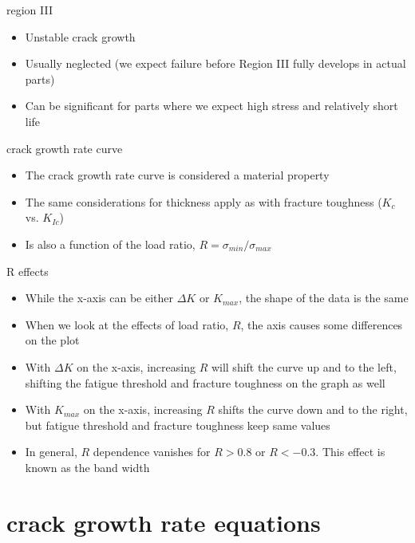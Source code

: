 \documentclass[10pt]{beamer}
\begin{document}
\begin{frame}{region III}
	\begin{itemize}[<+->]
		\item Unstable crack growth
		\item Usually neglected (we expect failure before Region III fully develops in actual parts)
		\item Can be significant for parts where we expect high stress and relatively short life
	\end{itemize}
\end{frame}

\begin{frame}{crack growth rate curve}
	\begin{itemize}[<+->]
		\item The crack growth rate curve is considered a material property
		\item The same considerations for thickness apply as with fracture toughness ($K_c$ vs. $K_{Ic}$) 
		\item Is also a function of the load ratio, $R = \sigma_{min}/\sigma_{max}$
	\end{itemize}
\end{frame}

\begin{frame}{R effects}
	\begin{itemize}[<+->]
		\item While the x-axis can be either $\Delta K$ or $K_{max}$, the shape of the data is the same
		\item When we look at the effects of load ratio, $R$, the axis causes some differences on the plot
		\item With $\Delta K$ on the x-axis, increasing $R$ will shift the curve up and to the left, shifting the fatigue threshold and fracture toughness on the graph as well
		\item With $K_{max}$ on the x-axis, increasing $R$ shifts the curve down and to the right, but fatigue threshold and fracture toughness keep same values
		\item In general, $R$ dependence vanishes for $R> 0.8$ or $R<-0.3$. This effect is known as the band width
	\end{itemize}
\end{frame}

\section{crack growth rate equations}
\end{document}
